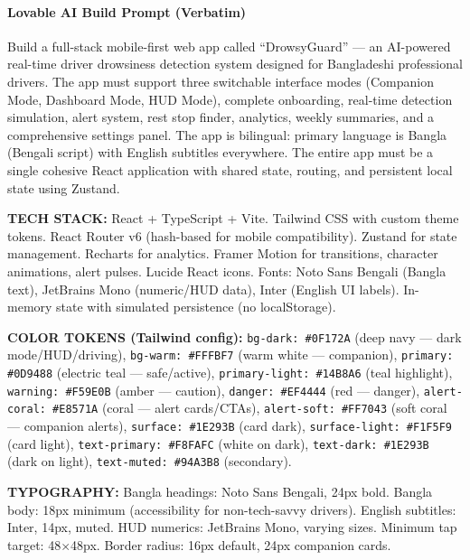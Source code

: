 \documentclass[sigconf]{acmart}
\begin{document}
\paragraph{Lovable AI Build Prompt (Verbatim)}
 
\begin{promptbox}
Build a full-stack mobile-first web app called ``DrowsyGuard'' --- an AI-powered real-time driver drowsiness detection system designed for Bangladeshi professional drivers. The app must support three switchable interface modes (Companion Mode, Dashboard Mode, HUD Mode), complete onboarding, real-time detection simulation, alert system, rest stop finder, analytics, weekly summaries, and a comprehensive settings panel. The app is bilingual: primary language is Bangla (Bengali script) with English subtitles everywhere. The entire app must be a single cohesive React application with shared state, routing, and persistent local state using Zustand.
 
\textbf{TECH STACK:} React + TypeScript + Vite. Tailwind CSS with custom theme tokens. React Router v6 (hash-based for mobile compatibility). Zustand for state management. Recharts for analytics. Framer Motion for transitions, character animations, alert pulses. Lucide React icons. Fonts: Noto Sans Bengali (Bangla text), JetBrains Mono (numeric/HUD data), Inter (English UI labels). In-memory state with simulated persistence (no localStorage).
 
\textbf{COLOR TOKENS (Tailwind config):} \texttt{bg-dark: \#0F172A} (deep navy --- dark mode/HUD/driving), \texttt{bg-warm: \#FFFBF7} (warm white --- companion), \texttt{primary: \#0D9488} (electric teal --- safe/active), \texttt{primary-light: \#14B8A6} (teal highlight), \texttt{warning: \#F59E0B} (amber --- caution), \texttt{danger: \#EF4444} (red --- danger), \texttt{alert-coral: \#E8571A} (coral --- alert cards/CTAs), \texttt{alert-soft: \#FF7043} (soft coral --- companion alerts), \texttt{surface: \#1E293B} (card dark), \texttt{surface-light: \#F1F5F9} (card light), \texttt{text-primary: \#F8FAFC} (white on dark), \texttt{text-dark: \#1E293B} (dark on light), \texttt{text-muted: \#94A3B8} (secondary).
 
\textbf{TYPOGRAPHY:} Bangla headings: Noto Sans Bengali, 24px bold. Bangla body: 18px minimum (accessibility for non-tech-savvy drivers). English subtitles: Inter, 14px, muted. HUD numerics: JetBrains Mono, varying sizes. Minimum tap target: 48$\times$48px. Border radius: 16px default, 24px companion cards.
 

\end{promptbox}
\end{document}
